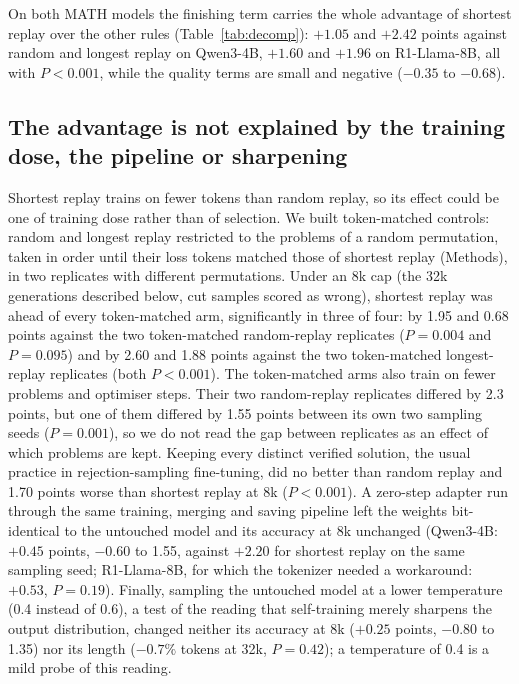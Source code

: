 \documentclass[10pt]{article}
\begin{document}
On both MATH models the finishing term carries the whole advantage of shortest replay over the other rules (Table~\ref{tab:decomp}): $+1.05$ and $+2.42$ points against random and longest replay on Qwen3-4B, $+1.60$ and $+1.96$ on R1-Llama-8B, all with $P<0.001$, while the quality terms are small and negative ($-0.35$ to $-0.68$).

\subsection{The advantage is not explained by the training dose, the pipeline or sharpening}
Shortest replay trains on fewer tokens than random replay, so its effect could be one of training dose rather than of selection. We built token-matched controls: random and longest replay restricted to the problems of a random permutation, taken in order until their loss tokens matched those of shortest replay (Methods), in two replicates with different permutations. Under an 8k cap (the 32k generations described below, cut samples scored as wrong), shortest replay was ahead of every token-matched arm, significantly in three of four: by 1.95 and 0.68 points against the two token-matched random-replay replicates ($P=0.004$ and $P=0.095$) and by 2.60 and 1.88 points against the two token-matched longest-replay replicates (both $P<0.001$). The token-matched arms also train on fewer problems and optimiser steps. Their two random-replay replicates differed by 2.3 points, but one of them differed by 1.55 points between its own two sampling seeds ($P=0.001$), so we do not read the gap between replicates as an effect of which problems are kept. Keeping every distinct verified solution, the usual practice in rejection-sampling fine-tuning\cite{yuan2023rft}, did no better than random replay and 1.70 points worse than shortest replay at 8k ($P<0.001$). A zero-step adapter run through the same training, merging and saving pipeline left the weights bit-identical to the untouched model and its accuracy at 8k unchanged (Qwen3-4B: $+0.45$ points, $-0.60$ to 1.55, against $+2.20$ for shortest replay on the same sampling seed; R1-Llama-8B, for which the tokenizer needed a workaround: $+0.53$, $P=0.19$). Finally, sampling the untouched model at a lower temperature (0.4 instead of 0.6), a test of the reading that self-training merely sharpens the output distribution, changed neither its accuracy at 8k ($+0.25$ points, $-0.80$ to 1.35) nor its length ($-0.7\%$ tokens at 32k, $P=0.42$); a temperature of 0.4 is a mild probe of this reading.
\end{document}
